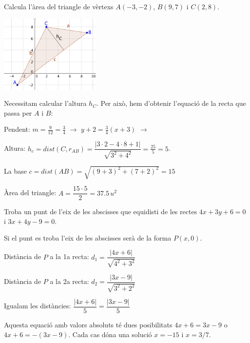 \begin{resolt}{Calcula l'àrea del triangle de vèrtexs $A(-3,-2)$, $B(9, 7)$ i $C(2,8)$.
		
	\includegraphics[width=5cm]{img-09/chap-anal-areat}
	}
	Necessitam calcular l'altura $h_C$. Per això, hem d'obtenir l'equació de la recta que passa per $A$ i $B$:\vspace{0.25cm}
	
	Pendent: $m=\frac{9}{12}=\frac{3}{4}$ $\rightarrow$ $y+2=\frac{3}{4}(x+3)$ $\rightarrow$ \vspace{0.25cm}
	
	Altura: $h_c=dist(C, r_{AB})=\dfrac{|3\cdot 2-4\cdot 8+1|}{\sqrt{3^2+4^2}}=\frac{25}{5}=5$.\vspace{0.25cm}
	
	La base $c=dist(AB)=\sqrt{(9+3)^2+(7+2)^2}=15$\vspace{0.25cm}
	
	Àrea del triangle: $A=\dfrac{15\cdot 5}{2}=37.5\, u^2$
\end{resolt}
\begin{resolt}{Troba un punt de l'eix de les abscisses que equidisti de les rectes $4x+3y+6=0$ i $3x+4y-9=0$.}
	
	Si el punt es troba l'eix de les abscisses serà de la forma $P(x,0)$. \vspace{0.25cm}
	
 	Distància de $P$ a la 1a recta: $d_1 = \dfrac{|4x+6|}{\sqrt{4^2+3^2}}$\vspace{0.25cm}
 	
 	 Distància de $P$ a la 2a recta: $d_2 = \dfrac{|3x-9|}{\sqrt{3^2+2^2}}$\vspace{0.25cm}
	
	Igualam les distàncies: $\dfrac{|4x+6|}{5}=\dfrac{|3x-9|}{5}$ \vspace{0.25cm}
	
	Aquesta equació amb valors absoluts té dues posibilitats $4x+6=3x-9$ o $4x+6=-(3x-9)$. Cada cas dóna una solució $x=-15$ i $x=3/7$. 
\end{resolt}

